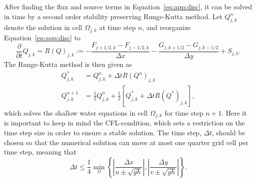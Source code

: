 \documentclass[11pt, a4paper]{article}
\begin{document}
After finding the flux and source terms in Equation~\eqref{eq:app:disc}, it can be solved in time by a second order stability preserving Runge-Kutta method.
Let $Q_{j,k}^n$ denote the solution in cell $\Omega_{j,k}$ at time step $n$, and reorganize Equation~\eqref{eq:app:disc} to
\begin{equation*}
	\frac{\partial}{\partial t} Q_{j,k} = R(Q)_{j,k} := - \frac{F_{j+1/2, k} - F_{j-1/2, k} }{\Delta x} - \frac{G_{j, k+1/2} - G_{j, k-1/2}}{\Delta y} + S_{j,k}.
\end{equation*}
The Runge-Kutta method is then given as
\begin{equation}
	\begin{split}
		Q^*_{j,k} &= Q_{j,k}^n + \Delta t R(Q^n)_{j,k} \\
		Q^{n+1}_{j,k} &= \frac{1}{2}Q^n_{j,k} + \frac{1}{2} \left [ Q^*_{j,k} + \Delta t R(Q^*)_{j,k} \right],
	\end{split}
	\label{eq:swe:rungekutta}
\end{equation}
which solves the shallow water equations in cell $\Omega_{j,k}$ for time step $n+1$.
Here it is important to keep in mind the CFL-condition, which sets a restriction on the time step size in order to ensure a stable solution.
The time step, $\Delta t$, should be chosen so that the numerical solution can move at most one quarter grid cell per time step, meaning that
\begin{equation}
	\Delta t \leq \frac{1}{4} \min_{\Omega} \left\{ \left| \frac{\Delta x}{u \pm \sqrt{gh}} \right|, 
									     \left| \frac{\Delta y}{v \pm \sqrt{gh}} \right| \right\}.
	\label{eq:swe:CFL}
\end{equation}








\todos
\end{document}
